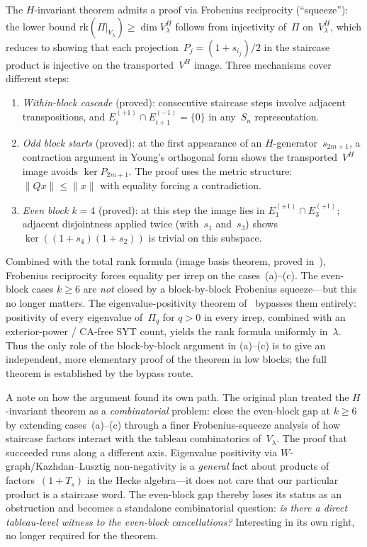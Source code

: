\begin{remark}
\label{rem:frobenius-proof}
The $H$-invariant theorem admits a proof via Frobenius reciprocity
(``squeeze''): the lower bound
$\mathrm{rk}(\Pi|_{V_\lambda}) \geq \dim V_\lambda^H$ follows from
injectivity of~$\Pi$ on~$V_\lambda^H$, which reduces to showing that
each projection~$P_j = (1+s_{i_j})/2$ in the staircase product is
injective on the transported~$V^H$ image.  Three mechanisms cover
different steps:
\begin{enumerate}[label=(\alph*)]
\item \emph{Within-block cascade} (proved): consecutive staircase steps
  involve adjacent transpositions, and $E_i^{(+1)} \cap E_{i+1}^{(-1)}
  = \{0\}$ in any~$S_n$ representation.
\item \emph{Odd block starts} (proved): at the first appearance of an
  $H$-generator~$s_{2m+1}$, a contraction argument in Young's
  orthogonal form shows the transported~$V^H$ image avoids
  $\ker P_{2m+1}$.  The proof uses the metric structure:
  $\|Qx\| \leq \|x\|$ with equality forcing a contradiction.
\item \emph{Even block $k=4$} (proved): at this step the image lies in
  $E_1^{(+1)} \cap E_3^{(+1)}$; adjacent disjointness applied twice
  (with~$s_1$ and~$s_3$) shows $\ker((1{+}s_4)(1{+}s_2))$ is trivial
  on this subspace.
\end{enumerate}
Combined with the total rank formula (image basis theorem, proved
in~\cite{clio-h-invariant-2026}), Frobenius reciprocity forces equality
per irrep on the cases~(a)--(c).  The even-block cases $k \geq 6$ are
\emph{not} closed by a block-by-block Frobenius squeeze---but this no
longer matters.  The eigenvalue-positivity theorem
of~\cite{clio-eigenvalue-positivity-2026} bypasses them entirely: positivity of every eigenvalue of~$\Pi_q$ for
$q > 0$ in every irrep, combined with an exterior-power / CA-free SYT
count, yields the rank formula uniformly in~$\lambda$.  Thus the only
role of the block-by-block argument in (a)--(c) is to give an
independent, more elementary proof of the theorem in low blocks; the
full theorem is established by the bypass route.
\par
A note on how the argument found its own path.  The original plan
treated the $H$-invariant theorem as a \emph{combinatorial} problem:
close the even-block gap at $k \geq 6$ by extending cases~(a)--(c)
through a finer Frobenius-squeeze analysis of how staircase factors
interact with the tableau combinatorics of~$V_\lambda$.  The proof
that succeeded runs along a different axis.  Eigenvalue positivity
via $W$-graph/Kazhdan--Lusztig non-negativity is a \emph{general}
fact about products of factors~$(1 + T_s)$ in the Hecke algebra---it
does not care that our particular product is a staircase word.  The
even-block gap thereby loses its status as an obstruction and becomes
a standalone combinatorial question: \emph{is there a direct
tableau-level witness to the even-block cancellations?}  Interesting
in its own right, no longer required for the theorem.
\end{remark}

